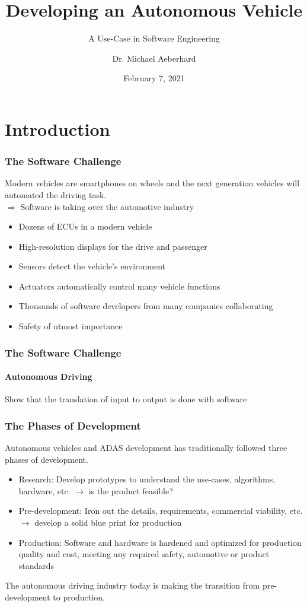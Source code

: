 \documentclass[aspectratio=169]{beamer}
\title{Developing an Autonomous Vehicle}
\subtitle{A Use-Case in Software Engineering}
\author{Dr. Michael Aeberhard}
\institute{Apex.AI}
\date{February 7, 2021}
\begin{document}
\frame{\titlepage}

\section{Introduction}





\begin{frame}
\frametitle{The Software Challenge}
Modern vehicles are smartphones on wheels and the next generation vehicles
will automated the driving task.\\
$\Rightarrow$ Software is taking over the automotive industry
\vspace{0.25cm}
\begin{itemize}
    \item Dozens of ECUs in a modern vehicle
    \item High-resolution displays for the drive and passenger
    \item Sensors detect the vehicle's environment
    \item Actuators automatically control many vehicle functions
    \item Thousands of software developers from many companies collaborating
    \item Safety of utmost importance
\end{itemize}
\end{frame}

\begin{frame}
\frametitle{The Software Challenge}
\framesubtitle{Autonomous Driving}
Show that the translation of input to output is done with software
\end{frame}

\begin{frame}
\frametitle{The Phases of Development}
Autonomous vehicles and ADAS development has traditionally followed three phases
of development.

\begin{itemize}
    \item Research: Develop prototypes to understand the use-cases, algorithms,
        hardware, etc. $\rightarrow$ is the product feasible?
    \item Pre-development: Iron out the details, requirements, commercial
        viability, etc. $\rightarrow$ develop a solid blue print for production
    \item Production: Software and hardware is hardened and optimized for
        production quality and cost, meeting any required safety, automotive or
        product standards
\end{itemize}
\pause
\begin{block}{}
The autonomous driving industry today is making the transition from
pre-development to production.
\end{block}
\end{frame}
\end{document}
